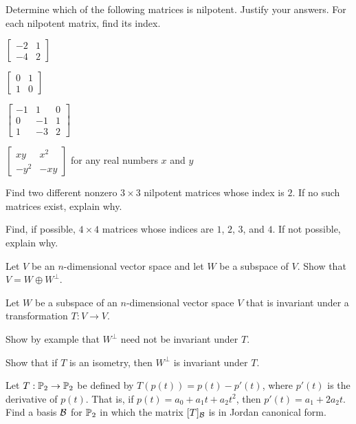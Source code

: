 \item  Determine which of the following matrices is nilpotent. Justify your answers. For each nilpotent matrix, find its index. 
\ba
\item $\left[ \begin{array}{rc} -2&1\\-4&2 \end{array} \right]$
\item $\left[ \begin{array}{cc} 0&1\\1&0 \end{array} \right]$
\item $\left[ \begin{array}{rrc} -1&1&0\\0&-1&1 \\1&-3&2 \end{array} \right]$
\item $\left[ \begin{array}{cc} xy&x^2\\-y^2&-xy \end{array} \right]$ for any real numbers $x$ and $y$
\ea

\item  Find two different nonzero $3 \times 3$ nilpotent matrices whose index is $2$. If no such matrices exist, explain why.

\item Find, if possible, $4 \times 4$ matrices whose indices are $1$, $2$, $3$, and $4$. If not possible, explain why.

\item Let $V$ be an $n$-dimensional vector space and let $W$ be a subspace of $V$. Show that $V = W \oplus W^{\perp}$. 

\item Let $W$ be a subspace of an $n$-dimensional vector space $V$ that is invariant under a transformation $T: V \to V$.
\ba
\item Show by example that $W^{\perp}$ need not be invariant under $T$. 

\item Show that if $T$ is an isometry, then $W^{\perp}$ is invariant under $T$. 

\ea

\item Let $T: \mathbb{P}_2 \to \mathbb{P}_2$ be defined by $T(p(t)) = p(t) - p'(t)$, where $p'(t)$ is the derivative of $p(t)$. That is, if $p(t) = a_0+a_1t+a_2t^2$, then $p'(t) = a_1 + 2a_2t$. Find a basis $\mathcal{B}$ for $\mathbb{P}_2$ in which the matrix $[T]_{\mathcal{B}}$ is in Jordan canonical form. 
 
